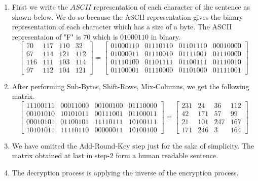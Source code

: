 \begin{enumerate}
    \item First we write the \(ASCII\) representation of each character of the sentence as shown below. We do so because the ASCII representation gives the binary representation of each character which has a size of a byte. The ASCII representaion of "F" is \(70\) which is \(01000110\) in binary.
    \[\begin{bmatrix}
        70 & 117 & 110 & 32 \\
        67 & 114 & 121 & 112\\
        116 & 111 & 103 & 114 \\
        97 & 112 & 104 & 121
    \end{bmatrix}=
    \begin{bmatrix}
        01000110 & 01110110 & 01101110 & 00010000 \\
        01000011 & 01110010 & 01111001 & 01110000\\
        01110100 & 01101111 & 01100111 & 01110010 \\
        01100001 & 01110000 & 01101000 & 01111001
    \end{bmatrix}
    \]

    \item After performing Sub-Bytes, Shift-Rows, Mix-Columns, we get the following matrix.
    \[\begin{bmatrix}
       11100111 & 00011000 & 00100100 & 01110000\\
       00101010 & 10101011 & 00111001 & 01100011\\
       00010101 & 01100101 & 11110111 & 10100111\\
       10101011 & 11110110 & 00000011 & 10100100
    \end{bmatrix}=
    \begin{bmatrix}
        231 & 24 & 36 & 112\\
        42 & 171 & 57 & 99\\
        21 & 101 & 247 & 167\\
        171 & 246 & 3 & 164
    \end{bmatrix}
    \]

    \item We have omitted the Add-Round-Key step just for the sake of simplicity. The matrix obtained at last in step-2 form a human readable sentence.

    \item The decryption process is applying the inverse of the encryption process.
\end{enumerate}
